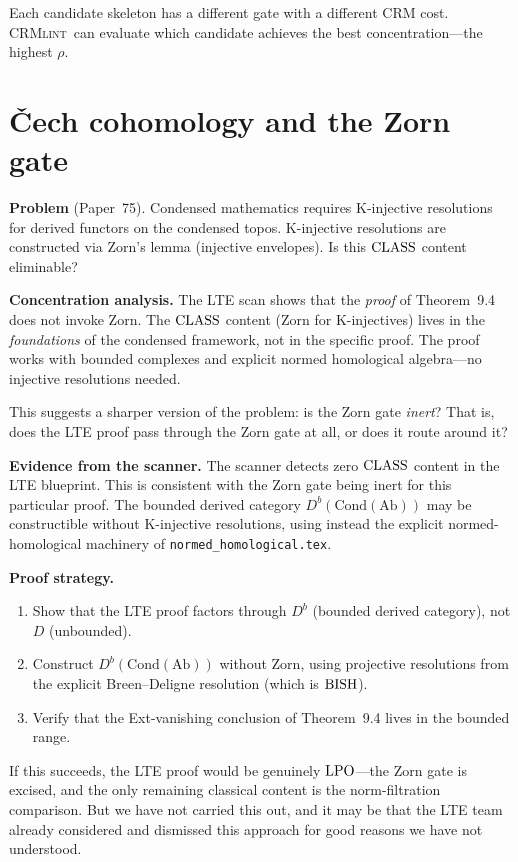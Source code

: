 \documentclass[11pt,a4paper]{article}
\theoremstyle{plain}
\theoremstyle{definition}
\newcommand{\BISH}{\textup{BISH}}
\newcommand{\LPO}{\textup{LPO}}
\newcommand{\CLASS}{\textup{CLASS}}
\newcommand{\CRMlint}{\textsc{CRMlint}}
\begin{document}
Each candidate skeleton has a different gate with a different CRM
cost.  \CRMlint\ can evaluate which candidate achieves the best
concentration---the highest $\rho$.

\section{\v{C}ech cohomology and the Zorn gate}\label{sec:cech}

\noindent\textbf{Problem} (Paper~75).
Condensed mathematics requires K-injective resolutions for derived
functors on the condensed topos.  K-injective resolutions are
constructed via Zorn's lemma (injective envelopes).  Is this $\CLASS$
content eliminable?

\medskip
\noindent\textbf{Concentration analysis.}
The LTE scan shows that the \emph{proof} of Theorem~9.4 does not
invoke Zorn.  The $\CLASS$ content (Zorn for K-injectives) lives in
the \emph{foundations} of the condensed framework, not in the specific
proof.  The proof works with bounded complexes and explicit normed
homological algebra---no injective resolutions needed.

This suggests a sharper version of the problem: is the Zorn gate
\emph{inert}?  That is, does the LTE proof pass through the Zorn gate
at all, or does it route around it?

\medskip
\noindent\textbf{Evidence from the scanner.}
The scanner detects zero $\CLASS$ content in the LTE blueprint.  This
is consistent with the Zorn gate being inert for this particular
proof.  The bounded derived category $D^b(\mathrm{Cond}(\mathrm{Ab}))$
may be constructible without K-injective resolutions, using instead
the explicit normed-homological machinery of \texttt{normed\_homological.tex}.

\medskip
\noindent\textbf{Proof strategy.}
\begin{enumerate}[nosep]
\item Show that the LTE proof factors through $D^b$ (bounded derived
  category), not $D$ (unbounded).
\item Construct $D^b(\mathrm{Cond}(\mathrm{Ab}))$ without Zorn,
  using projective resolutions from the explicit Breen--Deligne
  resolution (which is $\BISH$).
\item Verify that the Ext-vanishing conclusion of Theorem~9.4 lives
  in the bounded range.
\end{enumerate}

If this succeeds, the LTE proof would be genuinely $\LPO$---the
Zorn gate is excised, and the only remaining classical content is
the norm-filtration comparison.  But we have not carried this out,
and it may be that the LTE team already considered and dismissed
this approach for good reasons we have not understood.
\end{document}
